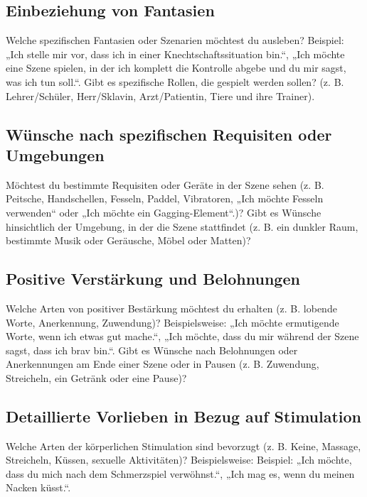 \documentclass[a4paper,12pt]{article}
\begin{document}
\subsection{Einbeziehung von Fantasien}
\noindent Welche spezifischen Fantasien oder Szenarien möchtest du ausleben? Beispiel: „Ich stelle mir vor, dass ich in einer Knechtschaftssituation bin.“, „Ich möchte eine Szene spielen, in der ich komplett die Kontrolle abgebe und du mir sagst, was ich tun soll.“. Gibt es spezifische Rollen, die gespielt werden sollen? (z. B. Lehrer/Schüler, Herr/Sklavin, Arzt/Patientin, Tiere und ihre Trainer). \newline
\noindent \TextField[name=WuenscheFantasien,multiline=true,height=20em, width=37em]{}

\subsection{Wünsche nach spezifischen Requisiten oder Umgebungen}
\noindent Möchtest du bestimmte Requisiten oder Geräte in der Szene sehen (z. B. Peitsche, Handschellen, Fesseln, Paddel, Vibratoren, „Ich möchte Fesseln verwenden“ oder „Ich möchte ein Gagging-Element“.)? Gibt es Wünsche hinsichtlich der Umgebung, in der die Szene stattfindet (z. B. ein dunkler Raum, bestimmte Musik oder Geräusche, Möbel oder Matten)? \newline
\noindent \TextField[name=WuenscheRequisiten,multiline=true,height=20em, width=37em]{}

\newpage

\subsection{Positive Verstärkung und Belohnungen}
\noindent Welche Arten von positiver Bestärkung möchtest du erhalten (z. B. lobende Worte, Anerkennung, Zuwendung)? Beispielsweise: „Ich möchte ermutigende Worte, wenn ich etwas gut mache.“, „Ich möchte, dass du mir während der Szene sagst, dass ich brav bin.“. Gibt es Wünsche nach Belohnungen oder Anerkennungen am Ende einer Szene oder in Pausen (z. B. Zuwendung, Streicheln, ein Getränk oder eine Pause)?\newline
\noindent \TextField[name=WuenscheVerst,multiline=true,height=20em, width=37em]{}

\subsection{Detaillierte Vorlieben in Bezug auf Stimulation}
\noindent Welche Arten der körperlichen Stimulation sind bevorzugt (z. B. Keine, Massage, Streicheln, Küssen, sexuelle Aktivitäten)? Beispielsweise: Beispiel: „Ich möchte, dass du mich nach dem Schmerzspiel verwöhnst.“, „Ich mag es, wenn du meinen Nacken küsst.“.\newline
\noindent \TextField[name=WuenscheStimu,multiline=true,height=20em, width=37em]{}
\end{document}
